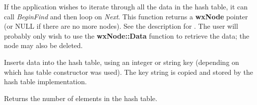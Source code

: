 If the application wishes to iterate through all the data in the hash
table, it can call {\it BeginFind} and then loop on {\it Next}. This function
returns a {\bf wxNode} pointer (or NULL if there are no more nodes).  See the
description for . The user will probably only wish to use the
{\bf wxNode::Data} function to retrieve the data; the node may also be deleted.




Inserts data into the hash table, using an integer or string key (depending on which
has table constructor was used). The key string is copied and stored by the hash
table implementation.



Returns the number of elements in the hash table.

